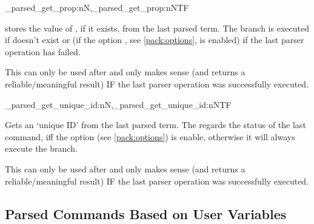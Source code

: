 \documentclass[10pt]{article}
\begin{document}
\begin{codedescribe}[code,new=2025/10/25]{\starray_parsed_get_prop:nN,\starray_parsed_get_prop:nNTF}
\begin{codesyntax}%
\end{codesyntax}
 stores the value of , if it exists, from the last parsed term. The  branch is executed if  doesn't exist or (if the option , see \ref{pack:options},  is enabled) if the last parser operation has failed.
\end{codedescribe}
\begin{tsremark}
This can only be used after  and only makes sense (and returns a reliable/meaningful result) IF the last parser operation was successfully executed.
\end{tsremark}

\begin{codedescribe}[code,new=2025/10/25]{\starray_parsed_get_unique_id:nN,\starray_parsed_get_unique_id:nNTF}
\begin{codesyntax}%
\end{codesyntax}
Gets an `unique ID' from the last parsed term. The  regards the status of the last  command, iff the option  (see \ref{pack:options}) is enable, otherwise it will always execute the  branch.
\end{codedescribe}
\begin{tsremark}
This can only be used after  and only makes sense (and returns a reliable/meaningful result) IF the last parser operation was successfully executed.
\end{tsremark}


\subsection{Parsed Commands Based on User Variables}\label{parsed:user-var}
\end{document}
